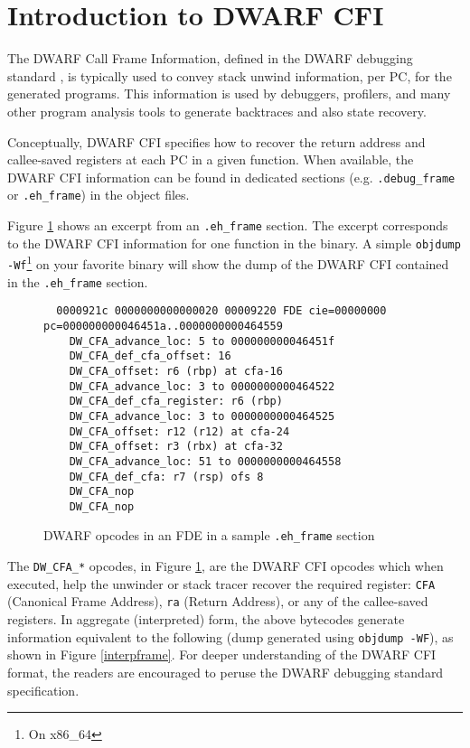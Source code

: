 \documentclass{article} \usepackage[a4paper, total={6in, 8in}]{geometry}
\begin{document}
\section{Introduction to DWARF CFI}

The DWARF Call Frame Information, defined in the DWARF debugging standard
\cite{DWARF5}, is typically used to convey stack unwind
information, per PC, for the generated programs.  This information is used by
debuggers, profilers, and many other program analysis tools to generate
backtraces and also state recovery.

Conceptually, DWARF CFI specifies how to recover the return address and
callee-saved registers at each PC in a given function.  When
available, the DWARF CFI information can be found in dedicated sections (e.g.
\texttt{.debug\_frame} or \texttt{.eh\_frame}) in the object files.

Figure \ref{dwarfframe} shows an excerpt from an \texttt{.eh\_frame} section.
The excerpt corresponds to the DWARF CFI information for one function in the
binary.  A simple \texttt{objdump -Wf}\footnote{On x86\_64} on your favorite
binary will show the dump of the DWARF CFI contained in the \texttt{.eh\_frame}
section.

\begin{figure}
\begin{verbatim}
  0000921c 0000000000000020 00009220 FDE cie=00000000 pc=000000000046451a..0000000000464559
    DW_CFA_advance_loc: 5 to 000000000046451f
    DW_CFA_def_cfa_offset: 16
    DW_CFA_offset: r6 (rbp) at cfa-16
    DW_CFA_advance_loc: 3 to 0000000000464522
    DW_CFA_def_cfa_register: r6 (rbp)
    DW_CFA_advance_loc: 3 to 0000000000464525
    DW_CFA_offset: r12 (r12) at cfa-24
    DW_CFA_offset: r3 (rbx) at cfa-32
    DW_CFA_advance_loc: 51 to 0000000000464558
    DW_CFA_def_cfa: r7 (rsp) ofs 8
    DW_CFA_nop
    DW_CFA_nop
  \end{verbatim}
  \caption{DWARF opcodes in an FDE in a sample \texttt{.eh\_frame} section}
  \label{dwarfframe}
\end{figure}

The \texttt{DW\_CFA\_*} opcodes, in Figure \ref{dwarfframe}, are the DWARF CFI
opcodes which when executed, help the unwinder or stack tracer recover the
required register: \texttt{CFA} (Canonical Frame Address), \texttt{ra} (Return
Address), or any of the callee-saved registers.  In aggregate (interpreted)
form, the above bytecodes generate information equivalent to the following
(dump generated using \texttt{objdump -WF}), as shown in Figure
\ref{interpframe}. For deeper understanding of the DWARF CFI format, the
readers are encouraged to peruse the DWARF debugging standard
specification\cite{DWARF5}.
\end{document}
